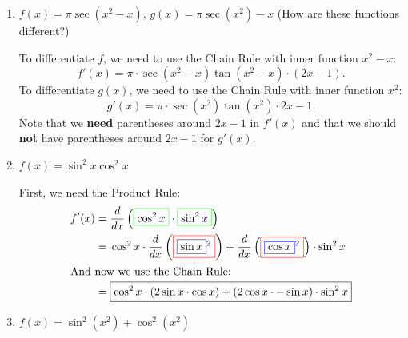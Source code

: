 \documentclass[main]{subfiles}
\begin{document}
\begin{enumerate}[resume]
\begin{enumerate}
  \item


    \begin{problem}[\vfill\vfill]
      $f(x) = \pi \sec ( x^2 - x)$, $g(x) = \pi \sec \left( x^2 \right) -
      x$ (How are these functions different?)
    \end{problem}

    \begin{solution}
      To differentiate $f$, we need to use the Chain Rule with  inner
      function $x^2-x$:
      \[ \boxed{f'(x) = \pi \cdot \sec(x^2-x)\tan(x^2-x) \cdot (2x -
        1)}.\] To differentiate $g(x)$, we need to use the Chain Rule with
      inner function $x^2$:
      \[ \boxed{g'(x) = \pi \cdot \sec(x^2)\tan(x^2) \cdot 2x - 1}.\] Note
      that we \textbf{need} parentheses around $2x-1$ in $f'(x)$ and that
      we should \textbf{not} have parentheses around $2x-1$ for $g'(x)$.
    \end{solution}

  \item
    \begin{problem}[\vfill]
      $f(x) = \sin^2 x \cos^2 x$
    \end{problem}

    \begin{solution}
      First, we need the Product Rule:
      \begin{align*}
        f'(x) = {} & \frac{d}{dx}
        \left(\fcolorbox{green}{white}{$\displaystyle \cos^2 x $}\cdot
          \fcolorbox{green}{white}{$\displaystyle  \sin^2 x $}\right) \\
        = {} & \cos^2 x \cdot \frac{d}{dx}
        \left(\fcolorbox{red}{white}{$\displaystyle
            \fcolorbox{blue}{white}{$\displaystyle \sin x$}^ { 2}
            $}\right)+ \frac{d}{dx}
        \left(\fcolorbox{red}{white}{$\displaystyle
            \fcolorbox{blue}{white}{$\displaystyle \cos x$}^ { 2}
            $}\right)\cdot \sin^2 x \\
        \intertext{And now we use the Chain Rule:} %
        = {} & \boxed{\cos^2 x \cdot \left(2 \sin x \cdot \cos x\right)+
          \left(2 \cos x \cdot -\sin x\right)\cdot \sin^2 x}
      \end{align*}
    \end{solution}

  \item
    \begin{problem}[\vfill\newpage]
      $f(x) = \sin^2\!\left( x^2 \right) + \cos^2\!\left( x^2 \right)$
    \end{problem}


\end{enumerate}
\end{enumerate}
\end{document}

